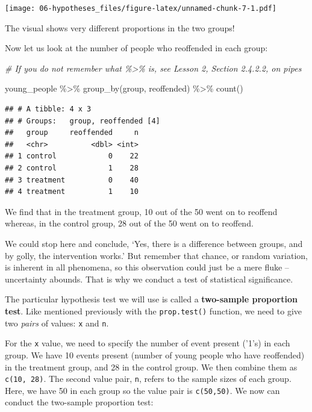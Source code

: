 \documentclass[
]{book}
\newenvironment{Shaded}{\begin{snugshade}}{\end{snugshade}}
\newcommand{\CommentTok}[1]{\textcolor[rgb]{0.56,0.35,0.01}{\textit{#1}}}
\newcommand{\FunctionTok}[1]{\textcolor[rgb]{0.00,0.00,0.00}{#1}}
\newcommand{\NormalTok}[1]{#1}
\newcommand{\SpecialCharTok}[1]{\textcolor[rgb]{0.00,0.00,0.00}{#1}}
\begin{document}
\texttt{[image: 06-hypotheses\_files/figure-latex/unnamed-chunk-7-1.pdf]}

The visual shows very different proportions in the two groups!

Now let us look at the number of people who reoffended in each group:

\begin{Shaded}
\begin{Highlighting}[]
\CommentTok{\# If you do not remember what \textquotesingle{}\%\textgreater{}\%\textquotesingle{} is, see Lesson 2, Section 2.4.2.2, on pipes}

\NormalTok{young\_people }\SpecialCharTok{\%\textgreater{}\%} \FunctionTok{group\_by}\NormalTok{(group, reoffended) }\SpecialCharTok{\%\textgreater{}\%} \FunctionTok{count}\NormalTok{()}
\end{Highlighting}
\end{Shaded}

\begin{verbatim}
## # A tibble: 4 x 3
## # Groups:   group, reoffended [4]
##   group     reoffended     n
##   <chr>          <dbl> <int>
## 1 control            0    22
## 2 control            1    28
## 3 treatment          0    40
## 4 treatment          1    10
\end{verbatim}

We find that in the treatment group, 10 out of the 50 went on to reoffend whereas, in the control group, 28 out of the 50 went on to reoffend.

We could stop here and conclude, `Yes, there is a difference between groups, and by golly, the intervention works.' But remember that chance, or random variation, is inherent in all phenomena, so this observation could just be a mere fluke -- uncertainty abounds. That is why we conduct a test of statistical significance.

The particular hypothesis test we will use is called a \textbf{two-sample proportion test}. Like mentioned previously with the \texttt{prop.test()} function, we need to give two \emph{pairs} of values: \texttt{x} and \texttt{n}.

For the \texttt{x} value, we need to specify the number of event present ('1's) in each group. We have 10 events present (number of young people who have reoffended) in the treatment group, and 28 in the control group. We then combine them as \texttt{c(10,\ 28)}. The second value pair, \texttt{n}, refers to the sample sizes of each group. Here, we have 50 in each group so the value pair is \texttt{c(50,50)}. We now can conduct the two-sample proportion test:
\end{document}
